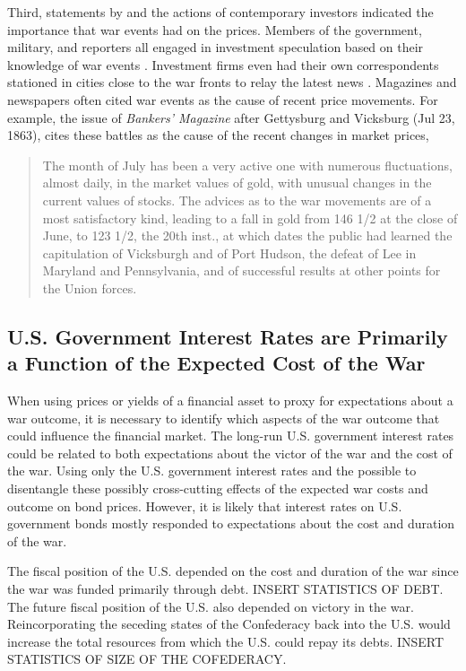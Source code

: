 Third, statements by and the actions of contemporary investors indicated the importance that war events had on the prices. %
Members of the government, military, and reporters all engaged in investment speculation based on their knowledge of war events \parencites[5-7]{Cornwallis1879}{Mitchell1903}[][1004]{WillardGuinnaneEtAl1996}.
Investment firms even had their own correspondents stationed in cities close to the war fronts to relay the latest news \parencites[5-7]{Cornwallis1879}. %
Magazines and newspapers often cited war events as the cause of recent price movements. %
For example, the issue of \textit{Bankers' Magazine} after Gettysburg and Vicksburg (Jul 23, 1863), cites these battles as the cause of the recent changes in market prices,
\begin{quote}
  The month of July has been a very active one with numerous fluctuations, almost daily, in the market values of gold, with unusual changes in the current values of stocks. %
  The advices as to the war movements are of a most satisfactory kind, leading to a fall in gold from 146 1/2 at the close of June, to 123 1/2, the 20th inst., at which dates the public had learned the  capitulation of Vicksburgh and of Port Hudson, the defeat of Lee in  Maryland and Pennsylvania, and of successful results at other points  for the Union forces. %
\parencite[159]{BankersMagazine1864}
\end{quote}



\subsection{U.S. Government Interest Rates are Primarily a Function of the Expected Cost of the War}
\label{bonds_battles:sec:u.s.-governm-inter}

When using prices or yields of a financial asset to proxy for expectations about a war outcome, it is necessary to identify which aspects of the war outcome that could influence the financial market.
The long-run U.S. government interest rates could be related to both expectations about the victor of the war and the cost of the war.
Using only the U.S. government interest rates and the  possible to disentangle these possibly cross-cutting effects of the expected war costs and outcome on bond prices.
However, it is likely that interest rates on U.S. government bonds mostly responded to expectations about the cost and duration of the war.

The fiscal position of the U.S. depended on the cost and duration of the war since the war was funded primarily through debt.
INSERT STATISTICS OF DEBT.
The future fiscal position of the U.S. also depended on victory in the war.
Reincorporating the seceding states of the Confederacy back into the U.S. would increase the total resources from which the U.S. could repay its debts.
INSERT STATISTICS OF SIZE OF THE COFEDERACY.

